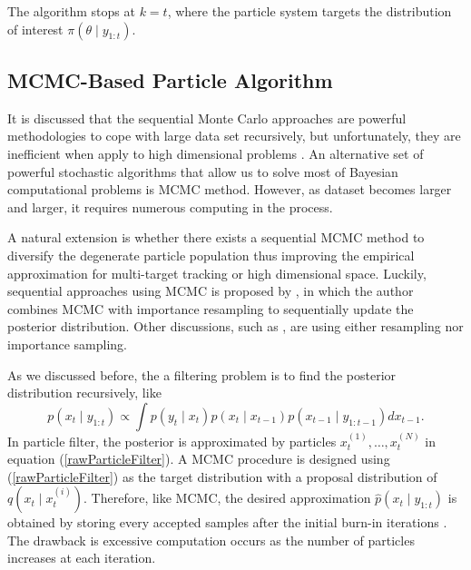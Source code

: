 The algorithm stops at $k=t$, where the particle system targets the distribution of interest $\pi(\theta\mid y_{1:t})$. 


\subsection{MCMC-Based Particle Algorithm}

It is discussed that the sequential Monte Carlo approaches are powerful methodologies to cope with large data set recursively, but unfortunately, they are inefficient when apply to high dimensional problems \citep{septier2009mcmc}.  An alternative set of powerful stochastic algorithms that allow us to solve most of Bayesian computational problems is MCMC method. However, as dataset becomes larger and larger, it requires numerous computing in the process. 

A natural extension is whether there exists a sequential MCMC method to diversify the degenerate particle population thus improving the empirical approximation for multi-target tracking or high dimensional space. Luckily, sequential approaches using MCMC is proposed by \cite{berzuini1997dynamic}, in which the author combines MCMC with importance resampling to sequentially update the posterior distribution. 
Other discussions, such as \citep{khan2005mcmc, golightly2006bayesian, pang2008models}, are using either resampling nor importance sampling. 

As we discussed before, the a filtering problem is to find the posterior distribution recursively, like 
\begin{equation}
p(x_t\mid y_{1:t}) \propto \int p(y_t\mid x_t)p(x_t\mid x_{t-1})p(x_{t-1}\mid y_{1:t-1})dx_{t-1}. 
\end{equation} 
In particle filter, the posterior is approximated by particles $x_t^{(1)},\ldots,x_t^{(N)}$ in equation (\ref{rawParticleFilter}). A MCMC procedure is designed using (\ref{rawParticleFilter}) as the target distribution with a proposal distribution of $q\left(x_t\mid x_t^{(i)}\right)$. Therefore, like MCMC, the desired approximation $\hat{p}(x_t\mid y_{1:t})$ is obtained by storing every accepted samples after the initial burn-in iterations \citep{septier2009mcmc}. The drawback is excessive computation occurs as the number of particles increases at each iteration. 

